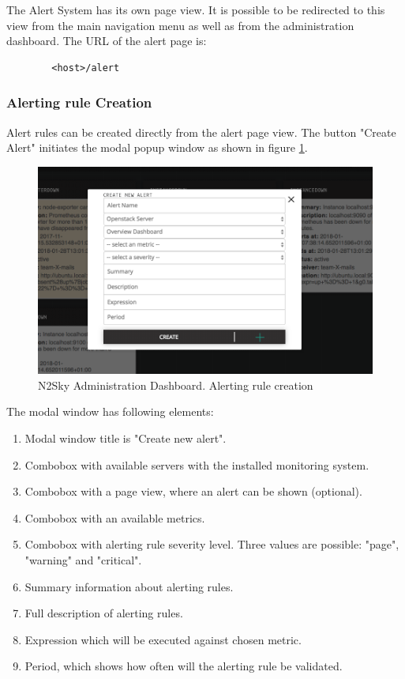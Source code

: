 The Alert System has its own page view. It is possible to be redirected to this view from the main navigation menu as well as from the administration dashboard. The URL of the alert page is:
\begin{lstlisting}
        <host>/alert
\end{lstlisting}

\subsubsection{Alerting rule Creation}\label{Alerting rule creation}

Alert rules can be created directly from the alert page view. The button "Create Alert" initiates the modal popup window as shown in figure \ref{fig:alert_create}.

\begin{figure}[H]
\begin{center}
  \includegraphics[width=\linewidth]{components/4/pics/alert_create.png}
  \caption{N2Sky Administration Dashboard. Alerting rule creation}
  \label{fig:alert_create}
\end{center}
\end{figure}

The modal window has following elements:
\begin{enumerate}
\item Modal window title is "Create new alert".
\item Combobox with available servers with the installed monitoring system.
\item Combobox with a page view, where an alert can be shown (optional).
\item Combobox with an available metrics.
\item Combobox with alerting rule severity level. Three values are possible: "page", "warning" and "critical".
\item Summary information about alerting rules.
\item Full description of alerting rules.
\item Expression which will be executed against chosen metric.
\item Period, which shows how often will the alerting rule be validated.
\end{enumerate}



